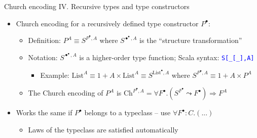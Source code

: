 \documentclass[english,,russian]{beamer}
\begin{document}
\begin{frame}{Church encoding IV. Recursive types and type constructors}
\begin{itemize}
\begin{itemize}
\item Note: $\forall X.P^{X}\Rightarrow F^{X}$ or $P^{\bullet}\leadsto F^{\bullet}$
resembles a natural transformation
\begin{itemize}
\item Except that $P^{\bullet}$ and $F^{\bullet}$ are not necessarily
functors, so no naturality law
\end{itemize}
\end{itemize}
\item Church encoding for a recursively defined type constructor $P^{\bullet}$:
\begin{itemize}
\item Definition: $P^{A}\equiv S^{P^{\bullet},A}$ where $S^{\bullet^{\bullet},A}$
is the ``structure transformation''
\item Notation: {\footnotesize{}$S^{\bullet^{\bullet},A}$} is a higher-order
type function; Scala syntax: \texttt{\textcolor{blue}{\footnotesize{}S{[}\_{[}\_{]},A{]}}} 
\begin{itemize}
\item {\footnotesize{}\vspace{-0.3cm}}Example: $\text{List}^{A}\equiv1+A\times\text{List}^{A}\equiv S^{\text{List}^{\bullet},A}$
where $S^{P^{\bullet},A}\equiv1+A\times P^{A}$ 
\end{itemize}
\item The Church encoding of $P^{A}$ is {\footnotesize{}$\text{Ch}^{P^{\bullet},A}=\forall F^{\bullet}.\left(S^{F^{\bullet}}\leadsto F^{\bullet}\right)\Rightarrow F^{A}$}{\footnotesize\par}
\end{itemize}
\item Works the same if $P^{\bullet}$ belongs to a typeclass -- use $\forall F^{\bullet}:C.\left(...\right)$
\begin{itemize}
\item Laws of the typeclass are satisfied automatically
\end{itemize}
\end{itemize}
\end{frame}
\end{document}
